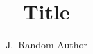 \documentclass{style/tudelft-report}
\begin{document}
\frontmatter

\title[Optional Subtitle]{Title}
\author{J.\ Random Author}
\makecover





\tableofcontents

\mainmatter



\appendix

%


\end{document}
